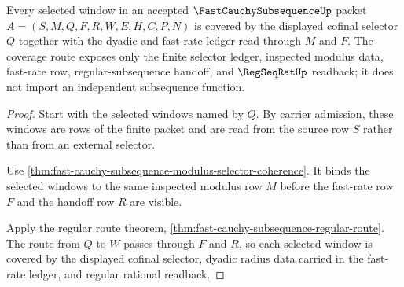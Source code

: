 \begin{theorem}
\label{thm:fast-cauchy-subsequence-selector-window-coverage}
Every selected window in an accepted $\FastCauchySubsequenceUp$ packet $A=(S,M,Q,F,R,W,E,H,C,P,N)$ is covered by the displayed cofinal selector $Q$ together with the dyadic and fast-rate ledger read through $M$ and $F$. The coverage route exposes only the finite selector ledger, inspected modulus data, fast-rate row, regular-subsequence handoff, and $\RegSeqRatUp$ readback; it does not import an independent subsequence function.
\end{theorem}
\begin{proof}
Start with the selected windows named by $Q$. By carrier admission, these windows are rows of the finite packet and are read from the source row $S$ rather than from an external selector.

Use \autoref{thm:fast-cauchy-subsequence-modulus-selector-coherence}. It binds the selected windows to the same inspected modulus row $M$ before the fast-rate row $F$ and the handoff row $R$ are visible.

Apply the regular route theorem, \autoref{thm:fast-cauchy-subsequence-regular-route}. The route from $Q$ to $W$ passes through $F$ and $R$, so each selected window is covered by the displayed cofinal selector, dyadic radius data carried in the fast-rate ledger, and regular rational readback.
\end{proof}

